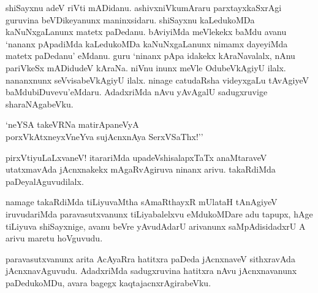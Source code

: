  shiSayxnu adeV riVti mADidanu. ashivxniVkumAraru parxtayxkaSxrAgi guruvina beVDikeyanunx maninxsidaru. shiSayxnu kaLedukoMDa kaNuNxgaLanunx matetx paDedanu. bAviyiMda meVlekekx baMdu avanu `nananx pApadiMda kaLedukoMDa kaNuNxgaLanunx nimamx dayeyiMda matetx paDedanu' eMdanu. guru `ninanx pApa idakekx kAraNavalalx, nAnu pariVkeSx mADidudeV kAraNa. niVnu inunx meVle OdubeVkAgiyU ilalx. nananxnunx seVvisabeVkAgiyU ilalx. ninage catudaRsha videyxgaLu tAvAgiyeV baMdubiDuvevu'eMdaru. AdadxriMda nAvu yAvAgalU sadugxruvige sharaNAgabeVku.
 
 \begin{shloka}
 `neYSA takeVRNa matirApaneVyA\\
 porxVkAtxneyxVneYva sujAcnxnAya SerxVSaThx!''
 \end{shloka}
 
 
 pirxVtiyuLaLxvaneV! itarariMda upadeVshisalapxTaTx anaMtaraveV utatxmavAda jAcnxnakekx mAgaRvAgiruva ninanx arivu. takaRdiMda paDeyalAguvudilalx.
 
 namage takaRdiMda tiLiyuvaMtha sAmaRthayxR mUlataH tAnAgiyeV iruvudariMda paravasutxvanunx tiLiyabalelxvu eMdukoMDare adu tapupx, hAge tiLiyuva shiSayxnige, avanu beVre yAvudAdarU arivanunx saMpAdisidadxrU A arivu maretu hoVguvudu. 
 
 paravasutxvanunx arita AcAyaRra hatitxra paDeda jAcnxnaveV sithxravAda jAcnxnavAguvudu. AdadxriMda sadugxruvina hatitxra nAvu jAcnxnavanunx paDedukoMDu, avara bagegx kaqtajacnxrAgirabeVku.
 
 


